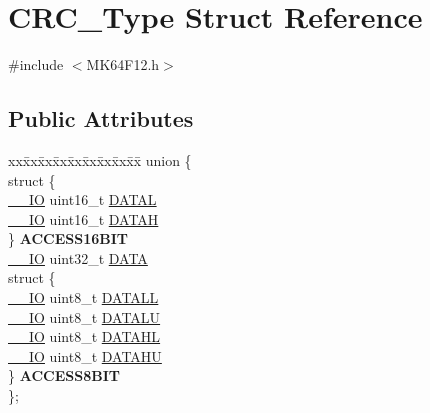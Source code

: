 \hypertarget{structCRC__Type}{}\section{C\+R\+C\+\_\+\+Type Struct Reference}
\label{structCRC__Type}


{\ttfamily \#include $<$M\+K64\+F12.\+h$>$}

\subsection*{Public Attributes}
\begin{DoxyCompactItemize}
\item 
\begin{tabbing}
xx\=xx\=xx\=xx\=xx\=xx\=xx\=xx\=xx\=\kill
union \{\\
\>struct \{\\
\>\>\hyperlink{core__sc300_8h_aec43007d9998a0a0e01faede4133d6be}{\_\_IO} uint16\_t \hyperlink{structCRC__Type_a1fa95f968c3054004e3c13e5bdcdd352}{DATAL}\\
\>\>\hyperlink{core__sc300_8h_aec43007d9998a0a0e01faede4133d6be}{\_\_IO} uint16\_t \hyperlink{structCRC__Type_a1638ce0ae66640d337c12b6790d4ba08}{DATAH}\\
\>\} {\bfseries ACCESS16BIT}\\
\>\hyperlink{core__sc300_8h_aec43007d9998a0a0e01faede4133d6be}{\_\_IO} uint32\_t \hyperlink{structCRC__Type_a9c6ce5850e78685541e9476bd77b1710}{DATA}\\
\>struct \{\\
\>\>\hyperlink{core__sc300_8h_aec43007d9998a0a0e01faede4133d6be}{\_\_IO} uint8\_t \hyperlink{structCRC__Type_abe8d9a7ce8dfc23656f519ae0fe3b88b}{DATALL}\\
\>\>\hyperlink{core__sc300_8h_aec43007d9998a0a0e01faede4133d6be}{\_\_IO} uint8\_t \hyperlink{structCRC__Type_abef76ff6106ba6495032c35b2e89cd87}{DATALU}\\
\>\>\hyperlink{core__sc300_8h_aec43007d9998a0a0e01faede4133d6be}{\_\_IO} uint8\_t \hyperlink{structCRC__Type_aa0d3f20454ee094861fe52fdede273ba}{DATAHL}\\
\>\>\hyperlink{core__sc300_8h_aec43007d9998a0a0e01faede4133d6be}{\_\_IO} uint8\_t \hyperlink{structCRC__Type_ac33c3631edd817832e77cd4a3553ddb3}{DATAHU}\\
\>\} {\bfseries ACCESS8BIT}\\
\}; \hypertarget{structCRC__Type_a2d3490d160f339f1926967253c360492}{}\label{structCRC__Type_a2d3490d160f339f1926967253c360492}
\\


\end{tabbing}
\end{DoxyCompactItemize}

